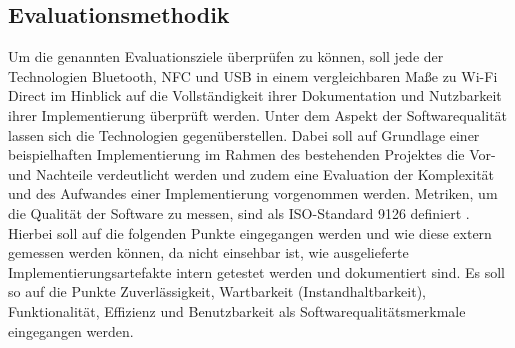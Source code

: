     \subsection{Evaluationsmethodik}
    	Um die genannten Evaluationsziele überprüfen zu können, soll jede der Technologien Bluetooth, NFC und USB in einem vergleichbaren Maße zu Wi-Fi Direct im Hinblick auf die Vollständigkeit ihrer Dokumentation und Nutzbarkeit ihrer Implementierung überprüft werden.
    	Unter dem Aspekt der Softwarequalität lassen sich die Technologien gegenüberstellen. Dabei soll auf Grundlage einer beispielhaften Implementierung im Rahmen des bestehenden Projektes die Vor- und Nachteile verdeutlicht werden und zudem eine Evaluation der Komplexität und des Aufwandes einer Implementierung vorgenommen werden. Metriken, um die Qualität der Software zu messen, sind als ISO-Standard 9126 definiert \cite[S.6]{liggesmeyer}. Hierbei soll auf die folgenden Punkte eingegangen werden und wie diese extern gemessen werden können, da nicht einsehbar ist, wie ausgelieferte Implementierungsartefakte intern getestet werden und dokumentiert sind. Es soll so auf die Punkte Zuverlässigkeit, Wartbarkeit (Instandhaltbarkeit), Funktionalität, Effizienz und Benutzbarkeit als Softwarequalitätsmerkmale eingegangen werden.
